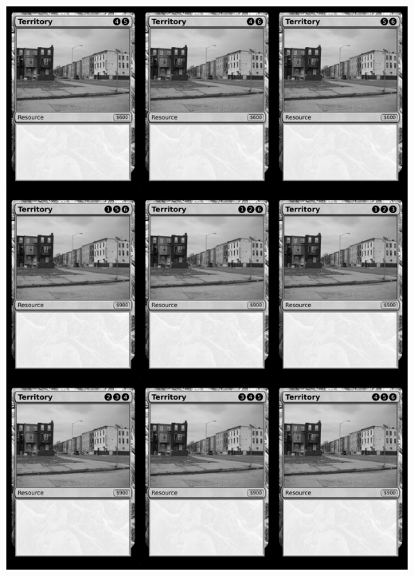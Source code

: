 \documentclass[a4paper]{article}
\begin{document}
\begin{center}
	\centering
	\includegraphics[width=190.5mm,height=266.7mm]{output/temp/page25.png}
\end{center}

\newpage
\end{document}
